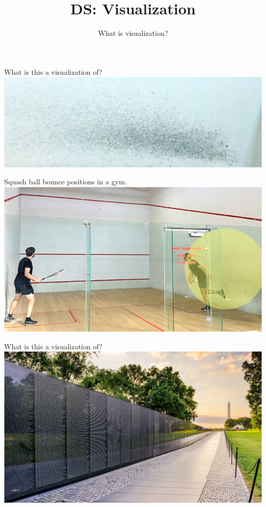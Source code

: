 \documentclass[aspectratio=169]{../latex_main/tntbeamer}  %
\title[Visualization]{DS: Visualization}
\subtitle{What is visualization?}
\begin{document}
	
	\maketitle
	\begin{frame}{What is this a visualization of?}
	    \centering
	    \includegraphics[scale=.5]{Bild1}
	\end{frame}
	
	
	\begin{frame}{Squash ball bounce positions in a gym.}
	    \centering
	    \includegraphics[scale=.5]{Bild2}
	\end{frame}
	
	
	\begin{frame}{What is this a visualization of?}
	    \centering
	    \includegraphics[scale=.5]{Bild3}
	\end{frame}
	
\end{document}
